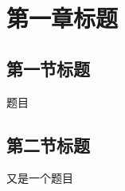 \documentclass[withinsec]{mathexercise}
\begin{document}
\chapter{第一章标题}



\section{第一节标题}
\begin{exercise}
    题目
\end{exercise}


\section{第二节标题}

\begin{exercise}
    又是一个题目
\end{exercise}
\end{document}
